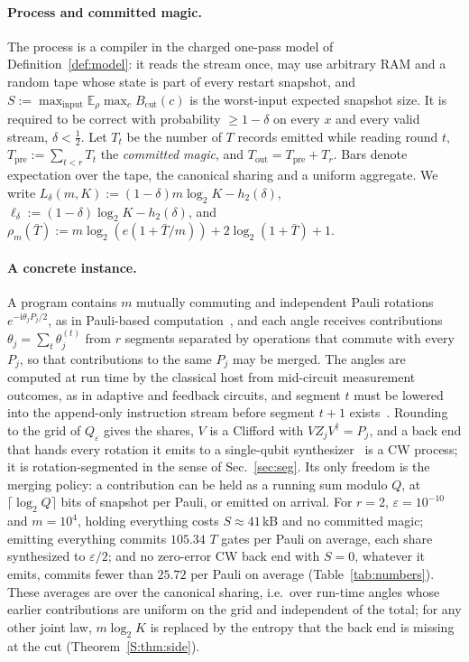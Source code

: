 \documentclass[aps,prx,twocolumn,superscriptaddress,nofootinbib,longbibliography]{revtex4-2}
\theoremstyle{plain}
\theoremstyle{definition}
\theoremstyle{remark}
\newcommand{\Tpre}{T_{\mathrm{pre}}}
\newcommand{\Tout}{T_{\mathrm{out}}}
\newcommand{\E}{\mathbb{E}}
\begin{document}
\paragraph{Process and committed magic.} The process is a compiler in the charged one-pass model of Definition~\ref{def:model}: it reads the stream once, may use arbitrary RAM and a random tape whose state is part of every restart snapshot, and $S:=\max_{\text{input}}\E_\rho\max_cB_{\mathrm{cut}}(c)$ is the worst-input expected snapshot size. It is required to be correct with probability $\ge1-\delta$ on every $x$ and every valid stream, $\delta<\tfrac12$. Let $T_t$ be the number of $T$ records emitted while reading round $t$, $\Tpre:=\sum_{t<r}T_t$ the \emph{committed magic}, and $\Tout=\Tpre+T_r$. Bars denote expectation over the tape, the canonical sharing and a uniform aggregate. We write $L_\delta(m,K):=(1-\delta)m\log_2K-h_2(\delta)$, $\ell_\delta:=(1-\delta)\log_2K-h_2(\delta)$, and $\rho_m(\bar T):=m\log_2(e(1+\bar T/m))+2\log_2(1+\bar T)+1$.

\paragraph{A concrete instance.} A program contains $m$ mutually commuting and independent Pauli rotations $e^{-\mathrm i\theta_jP_j/2}$, as in Pauli-based computation~\cite{Litinski}, and each angle receives contributions $\theta_j=\sum_t\theta^{(t)}_j$ from $r$ segments separated by operations that commute with every $P_j$, so that contributions to the same $P_j$ may be merged. The angles are computed at run time by the classical host from mid-circuit measurement outcomes, as in adaptive and feedback circuits, and segment $t$ must be lowered into the append-only instruction stream before segment $t+1$ exists~\cite{Caune,Fowler}. Rounding to the grid of $Q_\varepsilon$ gives the shares, $V$ is a Clifford with $VZ_jV^\dagger=P_j$, and a back end that hands every rotation it emits to a single-qubit synthesizer~\cite{RossSelinger} is a CW process; it is rotation-segmented in the sense of Sec.~\ref{sec:seg}. Its only freedom is the merging policy: a contribution can be held as a running sum modulo $Q$, at $\lceil\log_2Q\rceil$ bits of snapshot per Pauli, or emitted on arrival. For $r=2$, $\varepsilon=10^{-10}$ and $m=10^4$, holding everything costs $S\approx41$\,kB and no committed magic; emitting everything commits $105.34$ $T$ gates per Pauli on average, each share synthesized to $\varepsilon/2$; and no zero-error CW back end with $S=0$, whatever it emits, commits fewer than $25.72$ per Pauli on average (Table~\ref{tab:numbers}). These averages are over the canonical sharing, i.e.\ over run-time angles whose earlier contributions are uniform on the grid and independent of the total; for any other joint law, $m\log_2K$ is replaced by the entropy that the back end is missing at the cut (Theorem~\ref{S:thm:side}).
\end{document}
